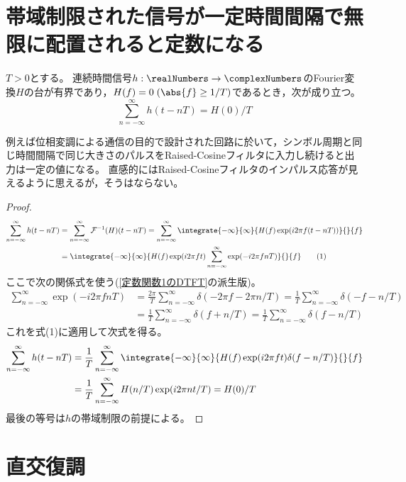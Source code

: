     \section{帯域制限された信号が一定時間間隔で無限に配置されると定数になる}
        \begin{shadebox}
            $T>0$とする。
            連続時間信号$h:\realNumbers\to\complexNumbers$のFourier変換$H$の台が有界であり，$H(f)=0\;(\abs{f}\geq 1/T)$であるとき，次が成り立つ。
            \[ \sum_{n=-\infty}^\infty h(t-nT) = H(0)/T \]
        \end{shadebox}
        例えば位相変調による通信の目的で設計された回路に於いて，シンボル周期と同じ時間間隔で同じ大きさのパルスをRaised-Cosineフィルタに入力し続けると出力は一定の値になる。
        直感的にはRaised-Cosineフィルタのインパルス応答が見えるように思えるが，そうはならない。
        \begin{proof}
            \begin{align*}
                \sum_{n=-\infty}^\infty h(t-nT) &= \sum_{n=-\infty}^\infty \mathcal{F}^{-1}(H)(t-nT) = \sum_{n=-\infty}^\infty\integrate{-\infty}{\infty}{H(f)\exp(i2\pi f(t-nT))}{}{f} \\
                &= \integrate{-\infty}{\infty}{H(f)\exp(i2\pi ft)\sum_{n=-\infty}^\infty\exp(-i2\pi fnT)}{}{f} \tag{1}
            \end{align*}
            ここで次の関係式を使う(\ref{定数関数1のDTFT}の派生版)。
            \begin{align*}
                \sum_{n=-\infty}^\infty\exp(-i2\pi fnT) &= \frac{2\pi}{T}\sum_{n=-\infty}^\infty\delta(-2\pi f - 2\pi n/T) = \frac{1}{T}\sum_{n=-\infty}^\infty\delta(-f - n/T) \\
                &= \frac{1}{T}\sum_{n=-\infty}^\infty\delta(f + n/T) = \frac{1}{T}\sum_{n=-\infty}^\infty\delta(f - n/T)
            \end{align*}
            これを式(1)に適用して次式を得る。
            \begin{align*}
                \sum_{n=-\infty}^\infty h(t-nT) &= \frac{1}{T}\sum_{n=-\infty}^\infty\integrate{-\infty}{\infty}{H(f)\exp(i2\pi ft)\delta(f-n/T)}{}{f} \\
                &= \frac{1}{T}\sum_{n=-\infty}^\infty H(n/T)\exp(i2\pi nt/T) = H(0)/T
            \end{align*}
            最後の等号は$h$の帯域制限の前提による。
        \end{proof}
    \section{直交復調}
